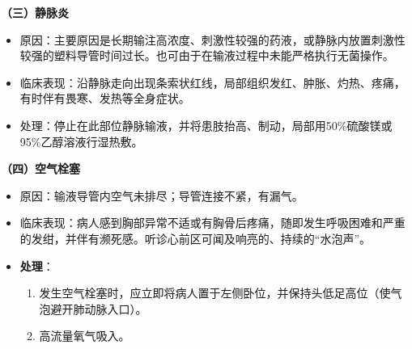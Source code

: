 \documentclass[11pt, a4paper]{ctexart}
\begin{document}
\textbf{（三）静脉炎}
\begin{itemize}
    \item 原因：主要原因是长期输注高浓度、刺激性较强的药液，或静脉内放置刺激性较强的塑料导管时间过长。也可由于在输液过程中未能严格执行无菌操作。
    \item 临床表现：沿静脉走向出现条索状红线，局部组织发红、肿胀、灼热、疼痛，有时伴有畏寒、发热等全身症状。
    \item 处理：停止在此部位静脉输液，并将患肢抬高、制动，局部用50\%硫酸镁或95\%乙醇溶液行湿热敷。
\end{itemize}

\textbf{（四）空气栓塞}
\begin{itemize}
    \item 原因：输液导管内空气未排尽；导管连接不紧，有漏气。
    \item 临床表现：病人感到胸部异常不适或有胸骨后疼痛，随即发生呼吸困难和严重的发绀，并伴有濒死感。听诊心前区可闻及响亮的、持续的“水泡声”。
    \item \textbf{处理}：
    \begin{enumerate}
        \item 发生空气栓塞时，应立即将病人置于左侧卧位，并保持头低足高位（使气泡避开肺动脉入口）。
        \item 高流量氧气吸入。
    \end{enumerate}
\end{itemize}
\end{document}
